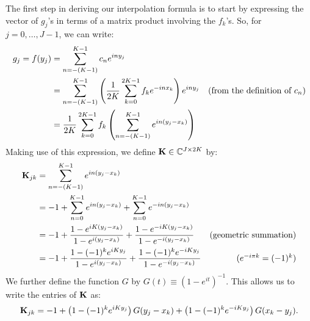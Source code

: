 The first step in deriving our interpolation formula is to
start by expressing the vector of $g_j$'s in terms of a matrix product
involving the $f_k$'s. So, for $j = 0, \hdots, J - 1$, we can write:
\begin{align*}
  g_j = f(y_j) &= \sum_{n=-(K-1)}^{K-1} c_n e^{iny_j} \\
  &= \sum_{n=-(K-1)}^{K-1} \left({1 \over 2K} \sum_{k=0}^{2K-1} f_k e^{-inx_k}\right) e^{iny_j} & \mbox{(from the definition of $c_n$)} \\
  &= {1 \over 2K} \sum_{k=0}^{2K-1} f_k \left(\sum_{n=-(K-1)}^{K-1} e^{in(y_j - x_k)}\right)
\end{align*}
Making use of this expression, we define $\bold{K} \in \mathbb{C}^{J \times 2K}$ by:
\begin{align*}
  \bold{K}_{jk} &= \sum_{n=-(K-1)}^{K-1} e^{in(y_j - x_k)} \\
  &= -1 + \sum_{n=0}^{K-1} e^{in(y_j - x_k)} + \sum_{n=0}^{K-1} e^{-in(y_j - x_k)} \\
  &= -1 + {1 - e^{iK(y_j - x_k)} \over 1 - e^{i(y_j - x_k)}} + {1 - e^{-iK(y_j - x_k)} \over 1 - e^{-i(y_j - x_k)}} & \mbox{(geometric summation)} \\
  &= -1 + {1 - (-1)^ke^{iKy_j} \over 1 - e^{i(y_j - x_k)}} + {1 - (-1)^ke^{-iKy_j} \over 1 - e^{-i(y_j - x_k)}} & \mbox{($e^{-i\pi k} = (-1)^k$)} \\
\end{align*}
We further define the function $G$ by $G(t) \equiv (1 -
e^{it})^{-1}$. This allows us to write the entries of $\bold{K}$ as:
\begin{align} \label{eqn:Kjk-in-terms-of-G-first-form}
  \bold{K}_{jk} = -1 + \left(1 - (-1)^ke^{iKy_j}\right) G(y_j - x_k) + \left(1 - (-1)^ke^{-iKy_j}\right) G(x_k - y_j).
\end{align}

